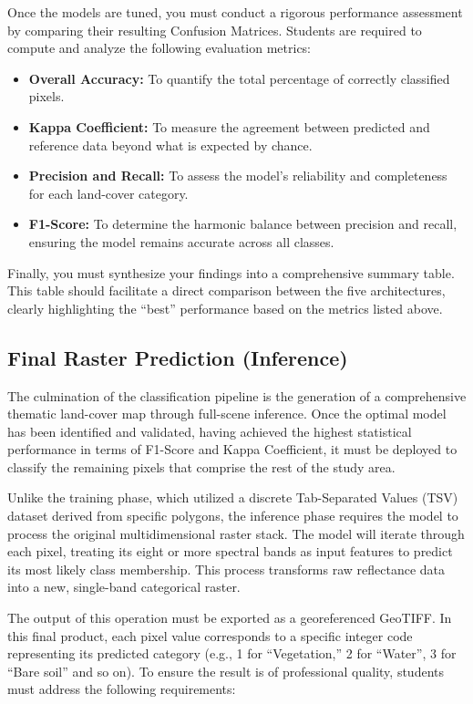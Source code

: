 \documentclass{article}
\begin{document}
Once the models are tuned, you must conduct a rigorous performance assessment by comparing their resulting Confusion Matrices. Students are required to compute and analyze the following evaluation metrics:
\begin{itemize}
    \item \textbf{Overall Accuracy:} To quantify the total percentage of correctly classified pixels.
    \item \textbf{Kappa Coefficient:} To measure the agreement between predicted and reference data beyond what is expected by chance.
    \item \textbf{Precision and Recall:} To assess the model's reliability and completeness for each land-cover category.
    \item \textbf{F1-Score:} To determine the harmonic balance between precision and recall, ensuring the model remains accurate across all classes.
\end{itemize}

Finally, you must synthesize your findings into a comprehensive summary table. This table should facilitate a direct comparison between the five architectures, clearly highlighting the ``best'' performance based on the metrics listed above.

\subsection{Final Raster Prediction (Inference)}
The culmination of the classification pipeline is the generation of a comprehensive thematic land-cover map through full-scene inference. Once the optimal model has been identified and validated, having achieved the highest statistical performance in terms of F1-Score and Kappa Coefficient, it must be deployed to classify the remaining pixels that comprise the rest of the study area.

Unlike the training phase, which utilized a discrete Tab-Separated Values (TSV) dataset derived from specific polygons, the inference phase requires the model to process the original multidimensional raster stack. The model will iterate through each pixel, treating its eight or more spectral bands as input features to predict its most likely class membership. This process transforms raw reflectance data into a new, single-band categorical raster.

The output of this operation must be exported as a georeferenced GeoTIFF. In this final product, each pixel value corresponds to a specific integer code representing its predicted category (e.g., 1 for ``Vegetation,'' 2 for ``Water'', 3 for ``Bare soil'' and so on). To ensure the result is of professional quality, students must address the following requirements:
\end{document}
